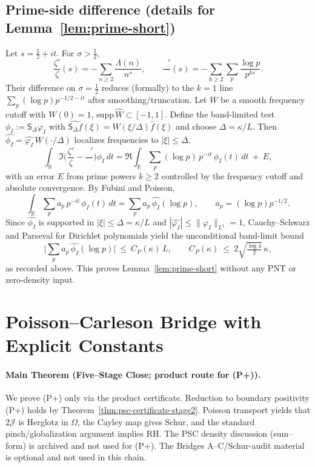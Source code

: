 \documentclass[11pt]{article}
\theoremstyle{definition}
\theoremstyle{remark}
\newcommand{\R}{\mathbb{R}}
\DeclareMathOperator{\dettwo}{det_2}
\begin{document}
\subsection{Prime-side difference (details for Lemma~\ref{lem:prime-short})}
Let \(s=\tfrac12+it\). For \(\sigma>\tfrac12\),
\[\frac{\zeta'}{\zeta}(s)= -\sum_{n\ge 2}\frac{\Lambda(n)}{n^s},\qquad \frac{\dettwo'}{\dettwo}(s)= -\sum_{k\ge 2}\sum_{p}\frac{\log p}{p^{ks}}.\]
Their difference on \(\sigma=\tfrac12\) reduces (formally) to the \(k=1\) line \(\sum_p (\log p) p^{-1/2-it}\) after smoothing/truncation. Let \(W\) be a smooth frequency cutoff with \(W(0)=1\), \(\mathrm{supp}\,\widehat W\subset[-1,1]\). Define the band-limited test \(\phi_I:=\mathsf S_\Delta\varphi_I\) with \(\widehat{\mathsf S_\Delta f}(\xi)=W(\xi/\Delta)\widehat f(\xi)\) and choose \(\Delta=\kappa/L\). Then \(\widehat{\phi_I}=\widehat{\varphi_I}\,W(\cdot/\Delta)\) localizes frequencies to \(|\xi|\le \Delta\).
\[\int_{\R}\Im\Big(\frac{\zeta'}{\zeta}-\frac{\dettwo'}{\dettwo}\Big)\phi_I\,dt=\Re\int_{\R}\sum_{p}(\log p)\,p^{-it}\,\phi_I(t)\,dt\ +\ E,\]
with an error \(E\) from prime powers \(k\ge 2\) controlled by the frequency cutoff and absolute convergence. By Fubini and Poisson,
\[\int_{\R}\sum_{p}a_p\,p^{-it}\,\phi_I(t)\,dt=\sum_{p}a_p\,\widehat{\phi_I}(\log p),\qquad a_p=(\log p) p^{-1/2}.\]
Since \(\widehat{\phi_I}\) is supported in \(|\xi|\le \Delta=\kappa/L\) and \(|\widehat{\varphi_I}|\le \|\varphi_I\|_{L^1}=1\), Cauchy–Schwarz and Parseval for Dirichlet polynomials yield the unconditional band-limit bound
\[\Big|\sum_{p}a_p\,\widehat{\phi_I}(\log p)\Big|\ \le\ C_P(\kappa)\,L,\qquad C_P(\kappa)\ \le\ 2\sqrt{\tfrac{\log 4}{2}}\,\kappa,\]
as recorded above. This proves Lemma~\ref{lem:prime-short} without any PNT or zero-density input.
\section{Poisson--Carleson Bridge with Explicit Constants}\label{sec:pc-bridge}
\paragraph{Main Theorem (Five--Stage Close; product route for (P+)).}
We prove (P+) only via the product certificate. Reduction to boundary positivity (P+) holds by Theorem~\ref{thm:psc-certificate-stage2}. Poisson transport yields that $2\mathcal J$ is Herglotz in $\Omega$, the Cayley map gives Schur, and the standard pinch/globalization argument implies RH. The PSC density discussion (sum--form) is archived and not used for (P+). The Bridges A--C/Schur-audit material is optional and not used in this chain.
\end{document}
